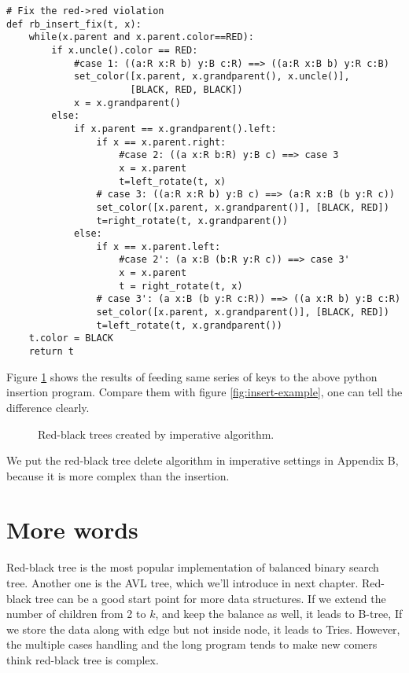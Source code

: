 \documentclass{article}
\begin{document}
\begin{lstlisting}
# Fix the red->red violation
def rb_insert_fix(t, x):
    while(x.parent and x.parent.color==RED):
        if x.uncle().color == RED:
            #case 1: ((a:R x:R b) y:B c:R) ==> ((a:R x:B b) y:R c:B)
            set_color([x.parent, x.grandparent(), x.uncle()],
                      [BLACK, RED, BLACK])
            x = x.grandparent()
        else:
            if x.parent == x.grandparent().left:
                if x == x.parent.right:
                    #case 2: ((a x:R b:R) y:B c) ==> case 3
                    x = x.parent
                    t=left_rotate(t, x)
                # case 3: ((a:R x:R b) y:B c) ==> (a:R x:B (b y:R c))
                set_color([x.parent, x.grandparent()], [BLACK, RED])
                t=right_rotate(t, x.grandparent())
            else:
                if x == x.parent.left:
                    #case 2': (a x:B (b:R y:R c)) ==> case 3'
                    x = x.parent
                    t = right_rotate(t, x)
                # case 3': (a x:B (b y:R c:R)) ==> ((a x:R b) y:B c:R)
                set_color([x.parent, x.grandparent()], [BLACK, RED])
                t=left_rotate(t, x.grandparent())
    t.color = BLACK
    return t
\end{lstlisting}

Figure \ref{fig:imperative-insert} shows the results of feeding same
series of keys to the above python insertion program. Compare them with
figure \ref{fig:insert-example}, one can tell the difference clearly.

\begin{figure}[htbp]
   \centering
   \caption{Red-black trees created by imperative algorithm.}
   \label{fig:imperative-insert}
\end{figure}

We put the red-black tree delete algorithm in imperative settings in Appendix B,
because it is more complex than the insertion.

\section{More words}
Red-black tree is the most popular implementation of balanced binary search
tree. Another one is the AVL tree, which we'll introduce in next chapter.
Red-black tree can be a good start point for more data structures. If we
extend the number of children from 2 to $k$, and keep the balance as well,
it leads to B-tree, If we store the data along with edge but not inside
node, it leads to Tries. However, the multiple cases handling and the long
program tends to make new comers think red-black tree is complex.
\end{document}

